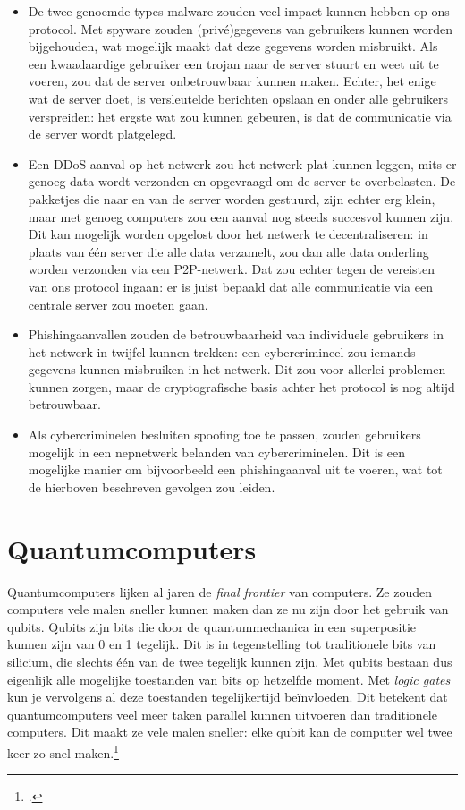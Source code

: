 \documentclass{report} %
\begin{document}
\begin{itemize}
    \item De twee genoemde types malware zouden veel impact kunnen hebben op ons protocol. Met spyware zouden (privé)gegevens van gebruikers kunnen worden bijgehouden, wat mogelijk maakt dat deze gegevens worden misbruikt. Als een kwaadaardige gebruiker een trojan naar de server stuurt en weet uit te voeren, zou dat de server onbetrouwbaar kunnen maken. Echter, het enige wat de server doet, is versleutelde berichten opslaan en onder alle gebruikers verspreiden: het ergste wat zou kunnen gebeuren, is dat de communicatie via de server wordt platgelegd. %
    \item Een DDoS-aanval op het netwerk zou het netwerk plat kunnen leggen, mits er genoeg data wordt verzonden en opgevraagd om de server te overbelasten. De pakketjes die naar en van de server worden gestuurd, zijn echter erg klein, maar met genoeg computers zou een aanval nog steeds succesvol kunnen zijn. Dit kan mogelijk worden opgelost door het netwerk te decentraliseren: in plaats van één server die alle data verzamelt, zou dan alle data onderling worden verzonden via een P2P-netwerk. Dat zou echter tegen de vereisten van ons protocol ingaan: er is juist bepaald dat alle communicatie via een centrale server zou moeten gaan.
    \item Phishingaanvallen zouden de betrouwbaarheid van individuele gebruikers in het netwerk in twijfel kunnen trekken: een cybercrimineel zou iemands gegevens kunnen misbruiken in het netwerk. Dit zou voor allerlei problemen kunnen zorgen, maar de cryptografische basis achter het protocol is nog altijd betrouwbaar.
    \item Als cybercriminelen besluiten spoofing toe te passen, zouden gebruikers mogelijk in een nepnetwerk belanden van cybercriminelen. Dit is een mogelijke manier om bijvoorbeeld een phishingaanval uit te voeren, wat tot de hierboven beschreven gevolgen zou leiden.
\end{itemize}

\chapter{Quantumcomputers}
Quantumcomputers lijken al jaren de \textit{final frontier} van computers. Ze zouden computers vele malen sneller kunnen maken dan ze nu zijn door het gebruik van qubits. Qubits zijn bits die door de quantummechanica in een superpositie kunnen zijn van 0 en 1 tegelijk. Dit is in tegenstelling tot traditionele bits van silicium, die slechts één van de twee tegelijk kunnen zijn. Met qubits bestaan dus eigenlijk alle mogelijke toestanden van bits op hetzelfde moment. Met \textit{logic gates} kun je vervolgens al deze toestanden tegelijkertijd beïnvloeden. Dit betekent dat quantumcomputers veel meer taken parallel kunnen uitvoeren dan traditionele computers. Dit maakt ze vele malen sneller: elke qubit kan de computer wel twee keer zo snel maken.\footnote{\cite{tandf_quantum}.}
\end{document}
